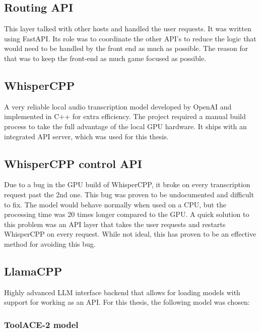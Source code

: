 \subsection{Routing API}



This layer talked with other hosts and handled the user requests. It was written using FastAPI.
Its role was to coordinate the other API's to reduce the logic that would need to be handled by the front end as much as possible.
The reason for that was to keep the front-end as much game focused as possible. 


\subsection{WhisperCPP}



A very reliable local audio transcription model developed by OpenAI and implemented in C++ for extra efficiency. 
The project required a manual build process to take the full advantage of the local GPU hardware.
It ships with an integrated API server, which was used for this thesis.



\subsection{WhisperCPP control API}



Due to a bug in the GPU build of WhisperCPP, it broke on every transcription request past the 2nd one.
This bug was proven to be undocumented and difficult to fix. 
The model would behave normally when used on a CPU, but the processing time was 20 times longer compared to the GPU.
A quick solution to this problem was an API layer that takes the user requests and restarts WhisperCPP on every request.
While not ideal, this has proven to be an effective method for avoiding this bug. 

\subsection{LlamaCPP}



Highly advanced LLM interface backend that allows for loading models with support for working as an API. For this thesis, the following model was chosen:



\subsubsection{ToolACE-2 model}



